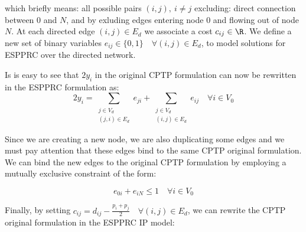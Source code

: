 which briefly means: all possible pairs $(i, j),\ i \ne j$ excluding: direct connection between $0$ and $N$, and by exluding edges entering node $0$ and flowing out of node $N$.
At each directed edge $(i, j) \in E_d$ we associate a cost $c_{ij} \in \R$.
We define a new set of binary variables $e_{ij} \in \{ 0, 1 \} \quad \forall (i, j) \in E_d$, to model solutions for ESPPRC over the directed network.

Is is easy to see that $2 y_i$ in the original CPTP formulation can now be rewritten in the ESPPRC formulation as:
\begin{equation}
	2 y_i = \sum_{\substack{j \in V_d \\ (j, i) \in E_d}} e_{ji} + \sum_{\substack{j \in V_d \\ (i, j) \in E_d}} e_{ij} \quad \forall i \in V_0
\end{equation}

Since we are creating a new node, we are also duplicating some edges and we must pay attention that these edges bind to the same CPTP original formulation.
We can bind the new edges to the original CPTP formulation by employing a mutually exclusive constraint of the form:

\begin{equation}
	e_{0i} + e_{iN} \le 1 \quad \forall i \in V_0
\end{equation}

Finally, by setting $c_{ij} = d_{ij} - \frac{p_i + p_j}{2} \quad \forall (i, j) \in E_d$, we can rewrite the CPTP original formulation in the ESPPRC IP model:

